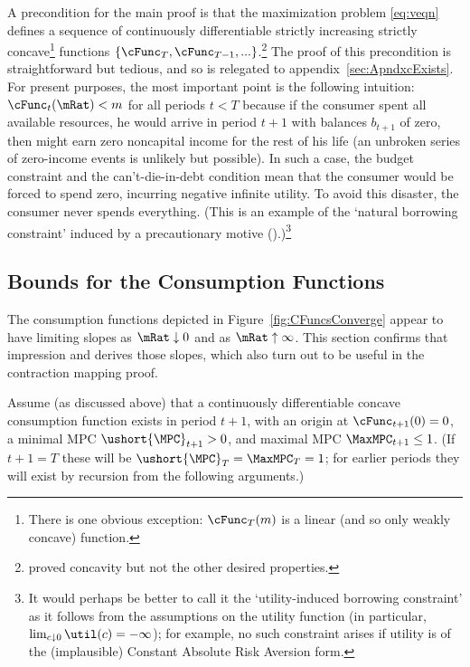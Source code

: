 \documentclass[titlepage]{\econtex}\providecommand{\texname}{BufferStockTheory}%
\begin{document}
A precondition for the main proof is that the maximization problem
\eqref{eq:veqn} defines a sequence of continuously differentiable
strictly increasing strictly concave\footnote{There is one obvious
  exception: $\cFunc_{T}(m)$ is a linear (and so only weakly concave)
  function.} functions
$\{\cFunc_{T},\cFunc_{T-1},...\}$.\footnote{\cite{carroll&kimball:concavity}
  proved concavity but not the other desired properties.}  The proof of this precondition is straightforward but tedious, and so is relegated to
appendix~\ref{sec:ApndxcExists}.  For present purposes, the most
important point is the following intuition: $\cFunc_{t}(\mRat) < m$
for all periods $t < T$ because if the consumer spent all available
resources, he would arrive in period $t+1$ with balances $b_{t+1}$ of
zero, then might earn zero noncapital income for the rest of his life
(an unbroken series of zero-income events is unlikely but possible).
In such a case, the budget constraint and the can't-die-in-debt
condition mean that the consumer would be forced to spend
zero, incurring negative infinite utility.  To avoid this disaster,
the consumer never spends everything.  (This is an example of the
`natural borrowing constraint' induced by a precautionary motive
(\cite{zeldesStochastic}).)\footnote{It would perhaps be better to call it
  the `utility-induced borrowing constraint' as it follows from the
  assumptions on the utility function (in particular, $\lim_{c
    \downarrow 0} \util(c)=-\infty$); for example, no such constraint
  arises if utility is of the (implausible) Constant Absolute Risk
  Aversion form.}

\subsection{Bounds for the Consumption Functions}

The consumption functions depicted in Figure~\ref{fig:CFuncsConverge} appear
to have limiting slopes as $\mRat \downarrow 0$ and as $\mRat \uparrow
\infty$.  This section confirms that impression and derives those
slopes, which also turn out to be useful in the contraction
mapping proof.

\newcommand{\NewMaxMinMPC}{\ushort{\MPC}}

Assume (as discussed above) that a continuously differentiable
concave consumption function exists in period $t+1$, with an origin at
$\cFunc_{t+1}(0)=0$, a minimal MPC $\NewMaxMinMPC_{t+1}>0$, and
maximal MPC $\MaxMPC_{t+1} \leq 1$.  (If $t+1 = T$ these will be
$\NewMaxMinMPC_{T}=\MaxMPC_{T}=1$; for earlier periods they will exist
by recursion from the following arguments.)
\end{document}
